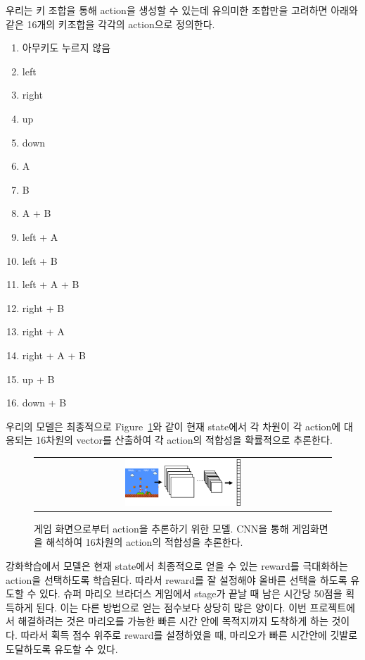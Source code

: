 우리는 키 조합을 통해 action을 생성할 수 있는데 유의미한 조합만을 고려하면 아래와 같은 16개의 키조합을 각각의 action으로 정의한다.
\begin{enumerate}
	\item 아무키도 누르지 않음
	\item left
	\item right
	\item up
	\item down
	\item A
	\item B
	\item A + B
	\item left + A
	\item left + B
	\item left + A + B
	\item right + B
	\item right + A
	\item right + A + B
	\item up + B
	\item down + B
\end{enumerate}
우리의 모델은 최종적으로 Figure~\ref{fig:overview}와 같이 현재 state에서 각 차원이 각 action에 대응되는 16차원의 vector를 산출하여 각 action의 적합성을 확률적으로 추론한다.
\begin{figure}[]
\begin{center}
\begin{tabular}{c}
     \includegraphics[width=0.4\textwidth]{FIG/overview.pdf} \\
\end{tabular}
\caption{
	게임 화면으로부터 action을 추론하기 위한 모델. CNN을 통해 게임화면을 해석하여 16차원의 action의 적합성을 추론한다.
}
\label{fig:overview}
\end{center}
\end{figure}

강화학습에서 모델은 현재 state에서 최종적으로 얻을 수 있는 reward를 극대화하는 action을 선택하도록 학습된다.
따라서 reward를 잘 설정해야 올바른 선택을 하도록 유도할 수 있다.
슈퍼 마리오 브라더스 게임에서 stage가 끝날 때 남은 시간당 50점을 획득하게 된다.
이는 다른 방법으로 얻는 점수보다 상당히 많은 양이다.
이번 프로젝트에서 해결하려는 것은 마리오를 가능한 빠른 시간 안에 목적지까지 도착하게 하는 것이다. 
따라서 획득 점수 위주로 reward를 설정하였을 때, 마리오가 빠른 시간안에 깃발로 도달하도록 유도할 수 있다.




